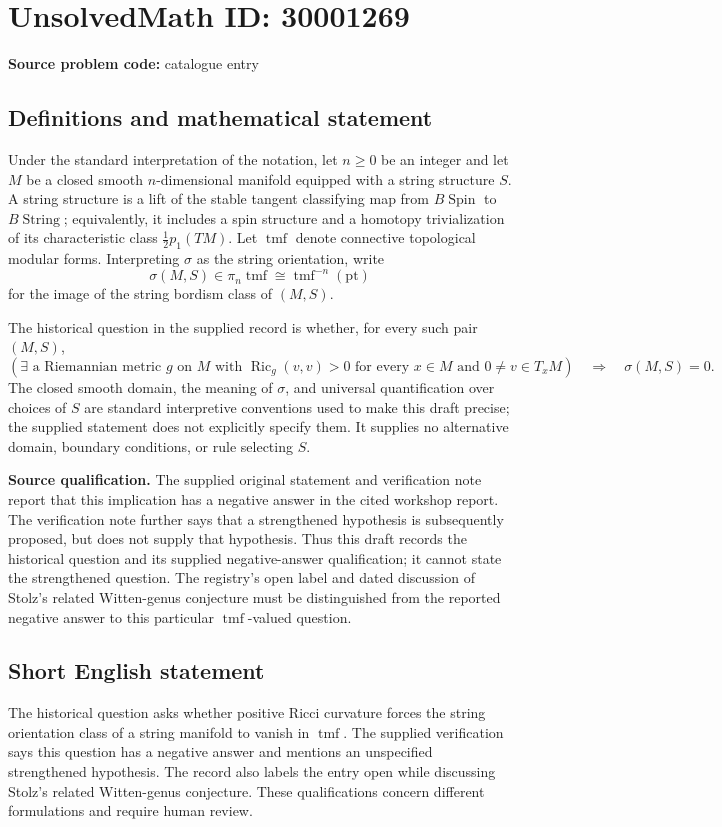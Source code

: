 \documentclass[11pt]{article}
\begin{document}
\section*{UnsolvedMath ID: 30001269}
\textbf{Source problem code:} catalogue entry
\subsection{Definitions and mathematical statement}
Under the standard interpretation of the notation, let \(n\geq 0\) be an integer and let \(M\) be a closed smooth \(n\)-dimensional manifold equipped with a string structure \(S\). A string structure is a lift of the stable tangent classifying map from \(B\operatorname{Spin}\) to \(B\operatorname{String}\); equivalently, it includes a spin structure and a homotopy trivialization of its characteristic class \(\tfrac12p_1(TM)\). Let \(\operatorname{tmf}\) denote connective topological modular forms. Interpreting \(\sigma\) as the string orientation, write
\[
\sigma(M,S)\in\pi_n\operatorname{tmf}
\cong\operatorname{tmf}^{-n}(\mathrm{pt})
\]
for the image of the string bordism class of \((M,S)\).

The historical question in the supplied record is whether, for every such pair \((M,S)\),
\[
\left(\exists\text{ a Riemannian metric }g\text{ on }M\text{ with }
\operatorname{Ric}_g(v,v)>0
\text{ for every }x\in M\text{ and }0\ne v\in T_xM\right)
\quad\Longrightarrow\quad
\sigma(M,S)=0.
\]
The closed smooth domain, the meaning of \(\sigma\), and universal quantification over choices of \(S\) are standard interpretive conventions used to make this draft precise; the supplied statement does not explicitly specify them. It supplies no alternative domain, boundary conditions, or rule selecting \(S\).

\textbf{Source qualification.} The supplied original statement and verification note report that this implication has a negative answer in the cited workshop report. The verification note further says that a strengthened hypothesis is subsequently proposed, but does not supply that hypothesis. Thus this draft records the historical question and its supplied negative-answer qualification; it cannot state the strengthened question. The registry's open label and dated discussion of Stolz's related Witten-genus conjecture must be distinguished from the reported negative answer to this particular \(\operatorname{tmf}\)-valued question.
\subsection{Short English statement}
The historical question asks whether positive Ricci curvature forces the string orientation class of a string manifold to vanish in \(\operatorname{tmf}\). The supplied verification says this question has a negative answer and mentions an unspecified strengthened hypothesis. The record also labels the entry open while discussing Stolz's related Witten-genus conjecture. These qualifications concern different formulations and require human review.
\end{document}
